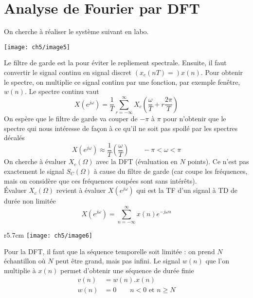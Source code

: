 		
	
	
	\newpage
	\section{Analyse de Fourier par DFT}
	On cherche à réaliser le système suivant en labo.
	\begin{center}
	\texttt{[image: ch5/image5]}
	\end{center}
	Le filtre de garde est la pour éviter le repliement spectrale. Ensuite, il faut convertir le signal 
	continu en signal discret $(x_c(nT)=)x(n)$. Pour obtenir le spectre, on multiplie ce signal continu par une 
	fonction, par exemple fenêtre, $w(n)$.  Le spectre continu vaut
	\begin{equation}
	X(e^{j\omega}) = \frac{1}{T}\sum_{r=-\infty}^\infty X_c\left(\frac{\omega}{T}+r\frac{2\pi}{T}\right)
	\end{equation}
	On espère que le filtre de garde va couper de $-\pi$ à $\pi$ pour n'obtenir que le spectre qui 
	nous intéresse de façon à ce qu'il ne soit pas spoilé par les spectres décalés
	\begin{equation}
	X(e^{j\omega})\approx \frac{1}{T}\left(\frac{\omega}{T}\right)\qquad -\pi<\omega<\pi
	\end{equation}
	On cherche à évaluer $X_c(\Omega)$ avec la DFT (évaluation en $N$ points). Ce n'est pas exactement 
	le signal $S_C(\Omega)$ à cause du filtre de garde (car coupe les fréquences, mais on considère que 
	ces fréquences coupées sont sans intérêts).\\
	
	Évaluer $X_c(\Omega)$ revient à évaluer $X(e^{j\omega})$ qui est la TF d'un signal à TD de durée
	non limitée
	\begin{equation}
	X(e^{j\omega}) = \sum_{n=-\infty}^\infty x(n)e^{-j\omega n}
	\end{equation}
	
	\begin{wrapfigure}[17]{r}{5.7cm}
	\vspace{-5mm}
	\texttt{[image: ch5/image6]}
	\end{wrapfigure}	
	Pour la DFT, il faut que la séquence temporelle soit limitée : on prend $N$ échantillon où $N$ 
	peut être grand, mais pas infini. Le signal $w(n)$ que l'on multiplie à $x(n)$ permet 
	d'obtenir une séquence de durée finie
	\begin{equation}
	\begin{array}{ll}
	v(n) &= w(n).x(n)\\
	w(n) &=0\qquad n<0\text{ et } n\geq N
	\end{array}
	\end{equation}
	
